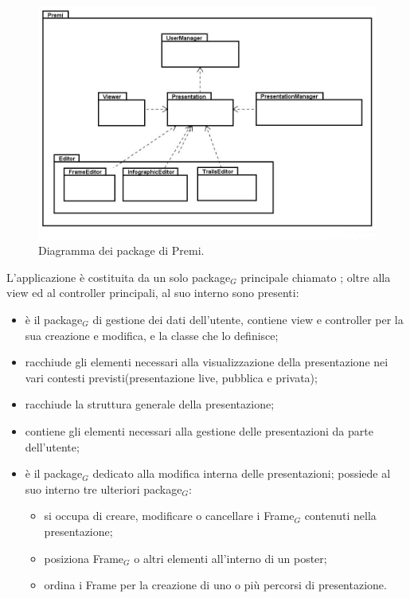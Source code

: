 \begin{figure}[h]
\begin{center}
\includegraphics[scale=0.45]{img/diapkg/pkg.jpg}
\caption{Diagramma dei package di Premi.}
\end{center}
\end{figure}

L'applicazione è costituita da un solo package$_G$ principale chiamato ; oltre alla view ed al controller principali, al suo interno sono presenti:
\begin{itemize}
\item {} è il package$_G$ di gestione dei dati dell'utente, contiene view e controller per la sua creazione e modifica, e la classe che lo definisce;
\item {} racchiude gli elementi necessari alla visualizzazione della presentazione nei vari contesti previsti(presentazione live, pubblica e privata);
\item {} racchiude la struttura generale della presentazione;
\item {} contiene gli elementi necessari alla gestione delle presentazioni da parte dell'utente;
\item {} è il package$_G$ dedicato alla modifica interna delle presentazioni; possiede al suo interno tre ulteriori package$_G$:
\begin{itemize}
\item {} si occupa di creare, modificare o cancellare i Frame$_G$ contenuti nella presentazione;
\item {} posiziona Frame$_G$ o altri elementi all'interno di un poster;
\item {} ordina i Frame per la creazione di uno o più percorsi di presentazione.
\end{itemize}
\end{itemize}
